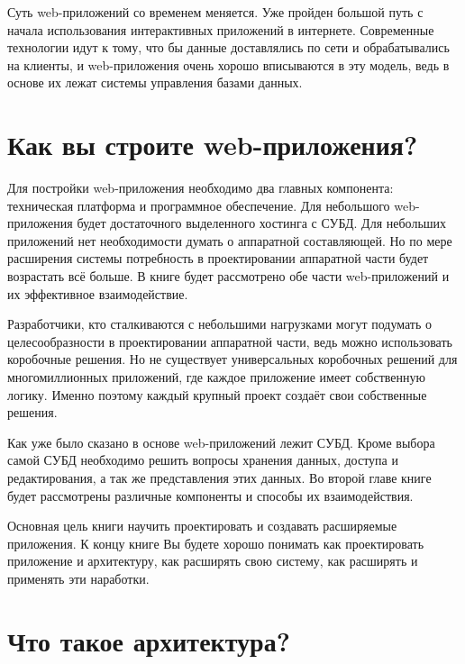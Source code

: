 Суть web-приложений со временем меняется. Уже пройден большой путь с начала использования интерактивных приложений в интернете. Современные технологии идут к тому, что бы данные доставлялись по сети и обрабатывались на клиенты, и web-приложения очень хорошо вписываются в эту модель, ведь в основе их лежат системы управления базами данных.


\section{Как вы строите web-приложения?} \label{sect1_2}

Для постройки web-приложения необходимо два главных компонента: техническая платформа и программное обеспечение. Для небольшого web-приложения будет достаточного выделенного хостинга с СУБД. Для небольших приложений нет необходимости думать о аппаратной составляющей. Но по мере расширения системы потребность в проектировании аппаратной части будет возрастать всё больше. В книге будет рассмотрено обе части web-приложений и их эффективное взаимодействие.


Разработчики, кто сталкиваются с небольшими нагрузками могут подумать о целесообразности в проектировании аппаратной части, ведь можно использовать коробочные решения. Но не существует универсальных коробочных решений для многомиллионных приложений, где  каждое приложение имеет собственную логику. Именно поэтому каждый крупный проект создаёт свои собственные решения.

Как уже было сказано в основе web-приложений лежит СУБД. Кроме выбора самой СУБД необходимо решить вопросы хранения данных, доступа и редактирования, а так же представления этих данных. Во второй главе книге будет рассмотрены различные компоненты и способы их взаимодействия.

Основная цель книги научить проектировать и создавать расширяемые приложения. К концу книге Вы будете хорошо понимать как проектировать приложение и архитектуру, как расширять свою систему, как расширять и применять эти наработки.



\section{Что такое архитектура?} \label{sect1_3}





\clearpage